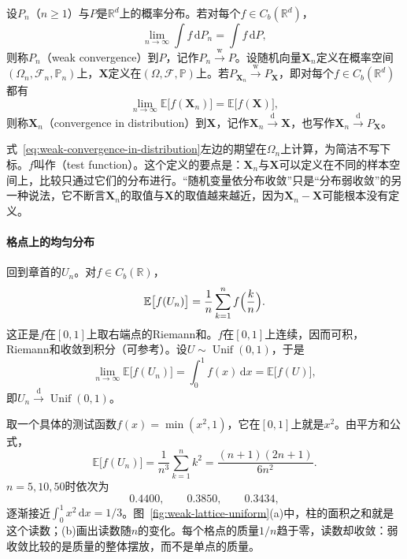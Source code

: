 \begin{definition}[弱收敛与依分布收敛]
\label{def:weak-convergence}
设$P_n$（$n\geq1$）与$P$是$\mathbb{R}^{d}$上的概率分布。若对每个$f\in C_b(\mathbb{R}^{d})$，
\begin{equation}
 \lim_{n\to\infty}\int f\,\mathrm{d}P_n=\int f\,\mathrm{d}P ,
 \label{eq:weak-definition}
\end{equation}
则称$P_n$（weak convergence）到$P$，记作$P_n\xrightarrow{\mathrm{w}}P$。设随机向量$\bm{X}_n$定义在概率空间$(\Omega_n,\mathcal{F}_n,\mathbb{P}_n)$上，$\bm{X}$定义在$(\Omega,\mathcal{F},\mathbb{P})$上。若$P_{\bm{X}_n}\xrightarrow{\mathrm{w}}P_{\bm{X}}$，即对每个$f\in C_b(\mathbb{R}^{d})$都有
\begin{equation}
 \lim_{n\to\infty}\mathbb{E}\bigl[f(\bm{X}_n)\bigr]=\mathbb{E}\bigl[f(\bm{X})\bigr] ,
 \label{eq:weak-convergence-in-distribution}
\end{equation}
则称$\bm{X}_n$（convergence in distribution）到$\bm{X}$，记作$\bm{X}_n\xrightarrow{\mathrm{d}}\bm{X}$，也写作$\bm{X}_n\xrightarrow{\mathrm{d}}P_{\bm{X}}$。
\end{definition}

式~\eqref{eq:weak-convergence-in-distribution}左边的期望在$\Omega_n$上计算，为简洁不写下标。$f$叫作（test function）。这个定义的要点是：$\bm{X}_n$与$\bm{X}$可以定义在不同的样本空间上，比较只通过它们的分布进行。“随机变量依分布收敛”只是“分布弱收敛”的另一种说法，它不断言$\bm{X}_n$的取值与$\bm{X}$的取值越来越近，因为$\bm{X}_n-\bm{X}$可能根本没有定义。

\paragraph{格点上的均匀分布}
回到章首的$U_n$。对$f\in C_b(\mathbb{R})$，
\[
 \mathbb{E}\bigl[f(U_n)\bigr]=\frac1n\sum_{k=1}^{n}f\Bigl(\frac kn\Bigr) .
\]
这正是$f$在$[0,1]$上取右端点的Riemann和。$f$在$[0,1]$上连续，因而可积，Riemann和收敛到积分（可参考）。设$U\sim\operatorname{Unif}(0,1)$，于是
\[
 \lim_{n\to\infty}\mathbb{E}\bigl[f(U_n)\bigr]=\int_0^1f(x)\,\mathrm{d}x=\mathbb{E}\bigl[f(U)\bigr] ,
\]
即$U_n\xrightarrow{\mathrm{d}}\operatorname{Unif}(0,1)$。

取一个具体的测试函数$f(x)=\min(x^2,1)$，它在$[0,1]$上就是$x^2$。由平方和公式，
\[
 \mathbb{E}\bigl[f(U_n)\bigr]=\frac{1}{n^{3}}\sum_{k=1}^{n}k^{2}=\frac{(n+1)(2n+1)}{6n^{2}} .
\]
$n=5,10,50$时依次为
\[
 0.4400,\qquad 0.3850,\qquad 0.3434,
\]
逐渐接近$\int_0^1x^2\,\mathrm{d}x=1/3$。图~\ref{fig:weak-lattice-uniform}(a)中，柱的面积之和就是这个读数；(b)画出读数随$n$的变化。每个格点的质量$1/n$趋于零，读数却收敛：弱收敛比较的是质量的整体摆放，而不是单点的质量。

